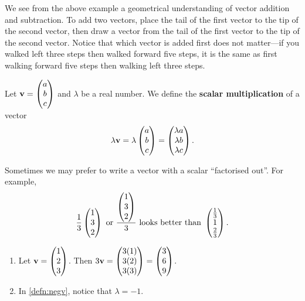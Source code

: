\documentclass[12pt]{article}
\renewcommand{\vec}{\mathbf}
\begin{document}
We see from the above example a geometrical understanding of vector addition and subtraction.
To add two vectors, place the tail of the first vector to the tip of the second vector, then draw a vector from the tail of the first vector to the tip of the second vector.
Notice that which vector is added first does not matter---if you walked left three steps then walked forward five steps, it is the same as first walking forward five steps then walking left three steps.
\begin{defn}
	Let \(\vec{v} = \cvec{a \\ b \\ c}\) and \(\lambda\) be a real number.
	We define the \textbf{scalar multiplication} of a vector
	\[\lambda \vec{v} = \lambda  \cvec{a \\ b \\ c} = \cvec{\lambda a \\ \lambda b \\ \lambda c}.\]
\end{defn}

Sometimes we may prefer to write a vector with a scalar ``factorised out''.
For example, 
\[ \frac{1}{3} \begin{pmatrix} 1 \\ 3 \\ 2 \end{pmatrix} \text{ or } \frac{\begin{pmatrix} 1 \\ 3 \\ 2 \end{pmatrix}}{3} \text{ looks better than } \begin{pmatrix} \frac{1}{3} \\ 1 \\ \frac{2}{3} \end{pmatrix}. \] 

\begin{eg}
	\begin{enumerate}
		\item Let \(\vec{v} = \cvec{1 \\ 2 \\ 3}\).
		Then \(3\vec{v} = \cvec{3(1) \\ 3(2) \\ 3(3)} = \cvec{3 \\ 6 \\ 9}\).
		\item In \ref{defn:negv}, notice that \(\lambda = -1\).
	\end{enumerate}
	\begin{figure}[H]
		\centering
	\end{figure}
\end{eg}
\end{document}
